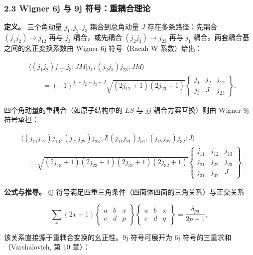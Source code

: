 \documentclass[
]{ctexbook}
\begin{document}
\hypertarget{wigner-6j-ux4e0e-9j-ux7b26ux53f7ux91cdux8026ux5408ux7406ux8bba}{%
\subsubsection{2.3 Wigner 6j 与 9j
符号：重耦合理论}\label{wigner-6j-ux4e0e-9j-ux7b26ux53f7ux91cdux8026ux5408ux7406ux8bba}}

\textbf{定义。} 三个角动量 \(j_1,j_2,j_3\) 耦合到总角动量 \(J\)
存在多条路径：先耦合 \((j_1j_2)\to j_{12}\) 再与 \(j_3\) 耦合，或先耦合
\((j_2j_3)\to j_{23}\) 再与 \(j_1\) 耦合。两套耦合基之间的幺正变换系数由
Wigner 6j 符号（Racah W 系数）给出：

\[
\begin{aligned}
&\bigl\langle (j_1j_2)j_{12},j_3;JM \big| j_1,(j_2j_3)j_{23};JM \bigr\rangle \\
&\qquad=(-1)^{j_1+j_2+j_3+J}\sqrt{(2j_{12}+1)(2j_{23}+1)}
\begin{Bmatrix} j_1 & j_2 & j_{12} \\ j_3 & J & j_{23} \end{Bmatrix}.
\end{aligned}
\]

四个角动量的重耦合（如原子结构中的 \(LS\) 与 \(jj\) 耦合方案互换）则由
Wigner 9j 符号承担：

\[
\begin{aligned}
&\bigl\langle (j_{11}j_{12})j_{13},(j_{21}j_{22})j_{23};J \big| (j_{11}j_{21})j_{31},(j_{12}j_{22})j_{32};J \bigr\rangle \\
&\quad=\sqrt{(2j_{13}+1)(2j_{23}+1)(2j_{31}+1)(2j_{32}+1)}
\begin{Bmatrix} j_{11} & j_{12} & j_{13} \\ j_{21} & j_{22} & j_{23} \\ j_{31} & j_{32} & J \end{Bmatrix}.
\end{aligned}
\]

\textbf{公式与推导。} 6j
符号满足四重三角条件（四面体四面的三角关系）与正交关系

\[\sum_{x}(2x+1)\begin{Bmatrix} a & b & x \\ c & d & p \end{Bmatrix}\begin{Bmatrix} a & b & x \\ c & d & q \end{Bmatrix}
=\frac{\delta_{pq}}{2p+1},\]

该关系直接源于重耦合变换的幺正性。9j 符号可展开为 6j
符号的三重求和（Varshalovich, 第 10 章）：
\end{document}
